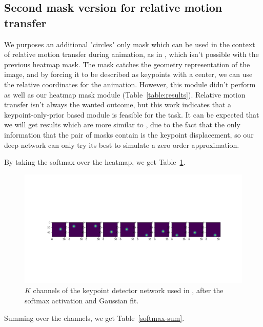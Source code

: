 \documentclass{article}
\begin{document}
\subsection{Second mask version for relative motion transfer}
We purposes an additional "circles" only mask
which can be used in the context
of relative motion transfer during animation, as in
\cite{siarohin2020order}, which isn't possible with the previous heatmap mask.
The mask catches the geometry representation \cite{wu2019transgaga} of the
image, and by forcing it to be described as keypoints with a center, we can
use the relative coordinates for the animation. However, this module didn't
perform as well as our heatmap mask module (Table~\ref{table:results}).
Relative motion transfer isn't always the wanted outcome, but this work
indicates that a keypoint-only-prior based module is feasible for the task.
It can be expected that we will get results which are more similar to
\cite{siarohin2019animating}, due to the fact that the only information
that the pair of masks contain is the keypoint displacement, so our deep
network can only try its best to simulate a zero order approximation.

By taking the softmax over the heatmap, we get Table~\ref{softmax-10kp}.
\begin{figure}[ht]
\vskip 0.2in
\begin{center}
\centerline{\includegraphics[width=\columnwidth]{visualizations/softmax_10kp}}
\caption{
$K$ channels of the keypoint detector network used in
\cite{siarohin2020order}, after the softmax activation and Gaussian fit.
}
\label{softmax-10kp}
\end{center}
\vskip -0.2in
\end{figure}

Summing over the channels, we get Table~\ref{softmax-sum}.
\end{document}
